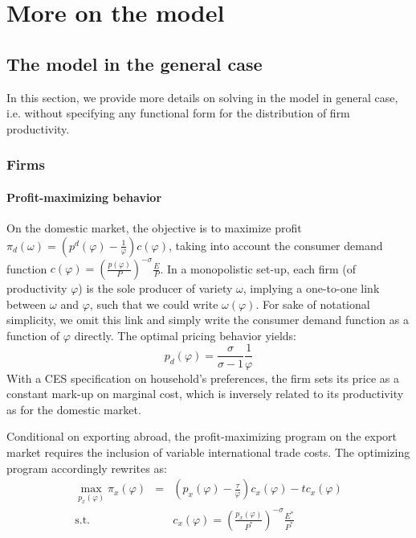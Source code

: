\documentclass[a4paper,11pt]{article}
\begin{document}
\section{More on the model \label{app:theoretical_model}}

\subsection{The model in the general case} \label{app: model_general}

In this section, we provide more details on solving in the model in general case, i.e. without specifying any functional form for the distribution of firm productivity.

\subsubsection{Firms}

\paragraph{Profit-maximizing behavior}

On the domestic market, the objective is to maximize profit $\pi_d(\omega)= \left(p^d(\varphi) -\frac{1}{\varphi}  \right)c(\varphi)$, taking into account the consumer demand function $c(\varphi) = \left(\frac{p(\varphi)}{P}  \right)^{-\sigma} \frac{E}{P}$. In a monopolistic set-up, each firm (of productivity $\varphi$) is the sole producer of variety $\omega$, implying a one-to-one link between $\omega$ and $\varphi$, such that we could write $\omega(\varphi)$. For sake of notational simplicity, we omit this link and simply write the consumer demand function as a function of $\varphi$ directly.
The optimal pricing behavior yields:
$$p_d(\varphi) = \frac{\sigma}{\sigma-1}\frac{1}{\varphi}$$
With a CES specification on household's preferences, the firm sets its price as a constant mark-up on marginal cost, which is inversely related to its productivity as for the domestic market. \medskip

Conditional on exporting abroad, the profit-maximizing program on the export market requires the inclusion of variable international trade costs. The optimizing program accordingly rewrites as:
\begin{eqnarray*}
\max_{p_x(\varphi)} \pi_x(\varphi) &=& \left(p_x(\varphi) -\frac{\tau}{\varphi}  \right)c_x(\varphi) - tc_x(\varphi) \\
\text{s.t. }&&c_x(\varphi) = \left(\frac{p_x(\varphi)}{P^\ast}  \right)^{-\sigma} \frac{E^\ast}{P^\ast}
\end{eqnarray*}
\end{document}
